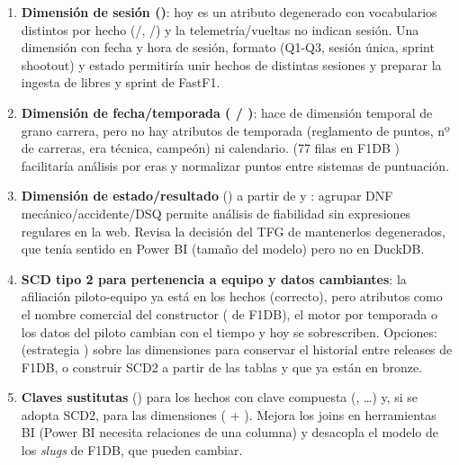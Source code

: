 \begin{enumerate}
\item \textbf{Dimensión de sesión ()}: hoy  es un atributo degenerado con vocabularios distintos por hecho (/, /) y la telemetría/vueltas no indican sesión. Una dimensión  con fecha y hora de sesión, formato (Q1-Q3, sesión única, sprint shootout) y estado permitiría unir hechos de distintas sesiones y preparar la ingesta de libres y sprint de FastF1.
\item \textbf{Dimensión de fecha/temporada ( / )}:  hace de dimensión temporal de grano carrera, pero no hay atributos de temporada (reglamento de puntos, nº de carreras, era técnica, campeón) ni calendario.  (77 filas en F1DB ) facilitaría análisis por eras y normalizar puntos entre sistemas de puntuación.
\item \textbf{Dimensión de estado/resultado} () a partir de  y : agrupar DNF mecánico/accidente/DSQ permite análisis de fiabilidad sin expresiones regulares en la web. Revisa la decisión del TFG de mantenerlos degenerados, que tenía sentido en Power BI (tamaño del modelo) pero no en DuckDB.
\item \textbf{SCD tipo 2 para pertenencia a equipo y datos cambiantes}: la afiliación piloto-equipo ya está en los hechos (correcto), pero atributos como el nombre comercial del constructor ( de F1DB), el motor por temporada o los datos del piloto cambian con el tiempo y hoy se sobrescriben. Opciones:  (estrategia ) sobre las dimensiones para conservar el historial entre releases de F1DB, o construir SCD2 a partir de las tablas  y  que ya están en bronze.
\item \textbf{Claves sustitutas} () para los hechos con clave compuesta (, …) y, si se adopta SCD2, para las dimensiones ( + ). Mejora los joins en herramientas BI (Power BI necesita relaciones de una columna) y desacopla el modelo de los \emph{slugs} de F1DB, que pueden cambiar.

\end{enumerate}
